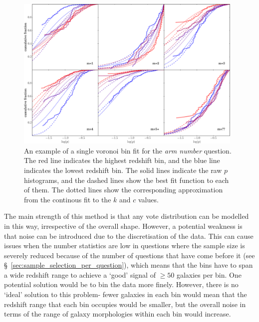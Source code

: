 \documentclass[useAMS,usenatbib]{mn2e}
\begin{document}
\begin{figure}
		\centering

        \includegraphics[width=0.975\textwidth]{Images/Bias/Debiasing/vbin_fit.pdf}

        \caption{An example of a single voronoi bin fit for the \textit{arm number} question. The red line indicates the highest redshift bin, and the blue line indicates the lowest redshift bin. The solid lines indicate the raw $p$ histograms, and the dashed lines show the best fit function to each of them. The dotted lines show the corresponding approximation from the continous fit to the $k$ and $c$ values.}

        \label{fig:function_fit}

\end{figure}

The main strength of this method is that any vote distribution can be modelled in this way, irrespective of the overall shape. However, a potential weakness is that noise can be introduced due to the discretisation of the data. This can cause issues when the number statistics are low in questions where the sample size is severely reduced because of the number of questions that have come before it (see \S~\ref{sec:sample_selection_per_question}), which means that the bins have to span a wide redshift range to achieve a `good' signal of $\geq50$ galaxies per bin. One potential solution would be to bin the data more finely. However, there is no `ideal' solution to this problem- fewer galaxies in each bin would mean that the redshift range that each bin occupies would be smaller, but the overall noise in terms of the range of galaxy morphologies within each bin would increase. 
\end{document}
